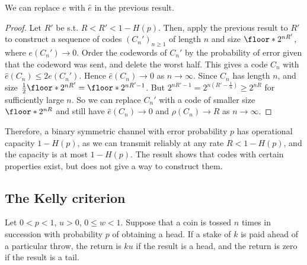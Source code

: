 \begin{proposition}
    We can replace $e$ with $\hat e$ in the previous result.
\end{proposition}
\begin{proof}
    Let $R'$ be s.t. $R < R' < 1 - H(p)$.
    Then, apply the previous result to $R'$ to construct a sequence of codes $(C_n')_{n \geq 1}$ of length $n$ and size $\floor*{2^{nR'}}$, where $e(C_n') \to 0$.
    Order the codewords of $C_n'$ by the probability of error given that the codeword was sent, and delete the worst half.
    This gives a code $C_n$ with $\hat e(C_n) \leq 2 e(C_n')$.
    Hence $\hat e(C_n) \to 0$ as $n \to \infty$.
    Since $C_n$ has length $n$, and size $\frac{1}{2} \floor*{2^{nR'}} = \floor*{2^{nR' - 1}}$.
    But $2^{nR' - 1} = 2^{n(R' - \frac{1}{n})} \geq 2^{nR}$ for sufficiently large $n$.
    So we can replace $C_n'$ with a code of smaller size $\floor*{2^{nR}}$ and still have $\hat e(C_n) \to 0$ and $\rho(C_n) \to R$ as $n \to \infty$.
\end{proof}
Therefore, a binary symmetric channel with error probability $p$ has operational capacity $1 - H(p)$, as we can transmit reliably at any rate $R < 1 - H(p)$, and the capacity is at most $1 - H(p)$.
The result shows that codes with certain properties exist, but does not give a way to construct them.

\subsection{The Kelly criterion}
Let $0 < p < 1$, $u > 0$, $0 \leq w < 1$.
Suppose that a coin is tossed $n$ times in succession with probability $p$ of obtaining a head.
If a stake of $k$ is paid ahead of a particular throw, the return is $ku$ if the result is a head, and the return is zero if the result is a tail.

